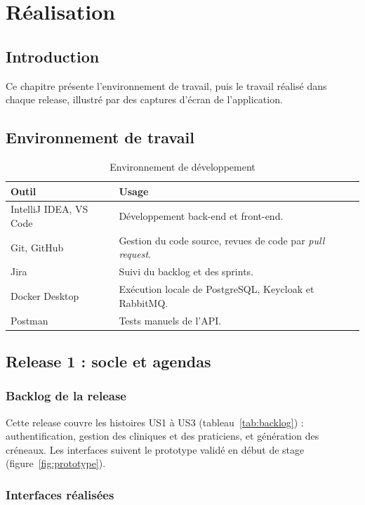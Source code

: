 \chapter{Réalisation}\label{ch:realisation}

\section*{Introduction}
Ce chapitre présente l'environnement de travail, puis le travail réalisé dans chaque release, illustré par des captures d'écran de l'application.

\section{Environnement de travail}
\begin{table}[H]\centering
\caption{Environnement de développement}\label{tab:env}
\begin{tabularx}{\linewidth}{lX}
\toprule
\textbf{Outil} & \textbf{Usage} \\
\midrule
IntelliJ IDEA, VS Code & Développement back-end et front-end. \\
Git, GitHub & Gestion du code source, revues de code par \textit{pull request}. \\
Jira & Suivi du backlog et des sprints. \\
Docker Desktop & Exécution locale de PostgreSQL, Keycloak et RabbitMQ. \\
Postman & Tests manuels de l'API. \\
\bottomrule
\end{tabularx}
\end{table}

\section{Release 1 : socle et agendas}
\subsection{Backlog de la release}
Cette release couvre les histoires US1 à US3 (tableau~\ref{tab:backlog}) : authentification, gestion des cliniques et des praticiens, et génération des créneaux. Les interfaces suivent le prototype validé en début de stage (figure~\ref{fig:prototype}).

\subsection{Interfaces réalisées}

